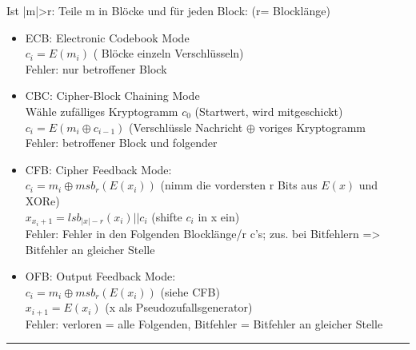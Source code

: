 Ist |m|>r: 	Teile m in Blöcke und für jeden Block: (r= Blocklänge)\\
\begin{itemize}
\item ECB: Electronic Codebook Mode \\
			$c_i = E(m_i)$		( Blöcke einzeln Verschlüsseln)\\
			Fehler: nur betroffener Block
\item CBC: Cipher-Block Chaining Mode	\\
			Wähle zufälliges Kryptogramm $c_0$		(Startwert, wird mitgeschickt)\\
			$c_i = E(m_i \oplus c_{i-1})$			(Verschlüssle Nachricht $\oplus$ voriges Kryptogramm\\
			Fehler: betroffener Block und folgender
\item CFB: Cipher Feedback Mode: \\
			$c_i = m_i \oplus msb_r(E(x_i))$	(nimm die vordersten r Bits aus $E(x)$ und XORe)\\
			$x_{x_i+1} = lsb_{|x|-r}(x_i) || c_i$      (shifte $c_i$ in x ein)\\
			Fehler: Fehler in den Folgenden Blocklänge/r c's; zus. bei Bitfehlern => Bitfehler an gleicher Stelle
\item OFB: Output Feedback Mode:\\
			$c_i = m_i \oplus msb_r(E(x_i))$ 	(siehe CFB)\\
			$x_{i+1} = E(x_i)		$		(x als Pseudozufallsgenerator)\\
			Fehler: verloren = alle Folgenden, Bitfehler = Bitfehler an gleicher Stelle
\end{itemize}

\rule{\textwidth}{1pt}